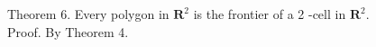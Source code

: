 Theorem 6. Every polygon in $\mathbf{R}^{2}$ is the frontier of a 2 -cell in $\mathbf{R}^{2}$.\\
Proof. By Theorem 4.
